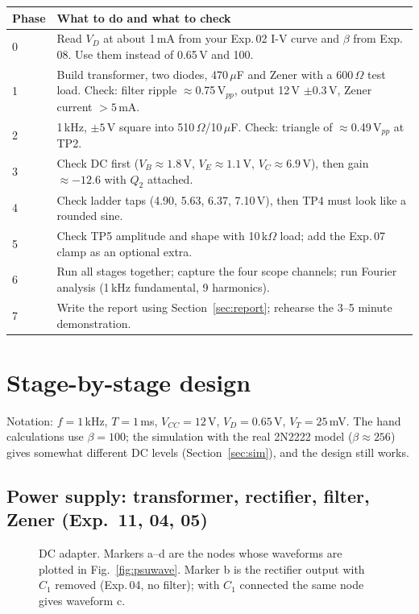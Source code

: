 \begin{tabularx}{\textwidth}{@{}lX@{}}
\toprule
Phase & What to do and what to check \\
\midrule
0 & Read $V_D$ at about 1\,mA from your Exp.\,02 I-V curve and $\beta$ from Exp.\,08. Use them instead of 0.65\,V and 100. \\
1 & Build transformer, two diodes, 470\,$\mu$F and Zener with a 600\,$\Omega$ test load. Check: filter ripple $\approx$0.75\,V$_{pp}$, output 12\,V $\pm$0.3\,V, Zener current $>5$\,mA. \\
2 & 1\,kHz, $\pm5$\,V square into 510\,$\Omega$/10\,$\mu$F. Check: triangle of $\approx$0.49\,V$_{pp}$ at TP2. \\
3 & Check DC first ($V_B\approx1.8$\,V, $V_E\approx1.1$\,V, $V_C\approx6.9$\,V), then gain $\approx-12.6$ with $Q_2$ attached. \\
4 & Check ladder taps (4.90, 5.63, 6.37, 7.10\,V), then TP4 must look like a rounded sine. \\
5 & Check TP5 amplitude and shape with 10\,k$\Omega$ load; add the Exp.\,07 clamp as an optional extra. \\
6 & Run all stages together; capture the four scope channels; run Fourier analysis (1\,kHz fundamental, 9 harmonics). \\
7 & Write the report using Section~\ref{sec:report}; rehearse the 3--5 minute demonstration. \\
\bottomrule
\end{tabularx}

\section{Stage-by-stage design}
Notation: $f=1$\,kHz, $T=1$\,ms, $V_{CC}=12$\,V, $V_D=0.65$\,V, $V_T=25$\,mV. The hand calculations use $\beta=100$; the simulation with the real 2N2222 model ($\beta\approx256$) gives somewhat different DC levels (Section~\ref{sec:sim}), and the design still works.

\subsection{Power supply: transformer, rectifier, filter, Zener (Exp.\ 11, 04, 05)}
\begin{figure}[H]
\centering
\resizebox{\textwidth}{!}{\begin{circuitikz}[font=\scriptsize,line width=0.7pt]
\psuckt
\end{circuitikz}}
\caption{DC adapter. Markers a--d are the nodes whose waveforms are plotted in Fig.~\ref{fig:psuwave}. Marker b is the rectifier output with $C_1$ removed (Exp.\,04, no filter); with $C_1$ connected the same node gives waveform c.}
\end{figure}

